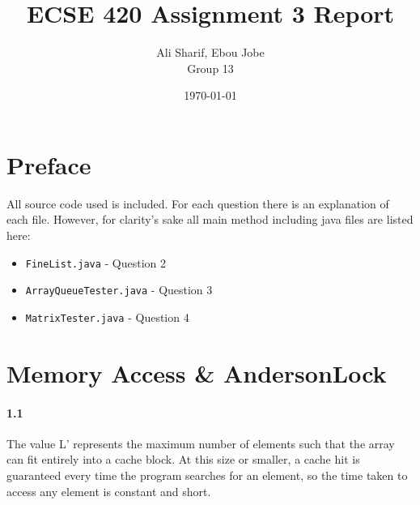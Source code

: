 \documentclass[12pt,letterpaper,titlepage]{article}
\author{Ali Sharif, Ebou Jobe \\ Group 13}
\title{ECSE 420 Assignment 3 Report}
\date{\today}
\begin{document}
  \maketitle
  \newpage
  \tableofcontents
  \newpage
  
  \setlength{\parskip}{1em}
  
  \section{Preface}
    All source code used is included. For each question there is an explanation of each file. However, for clarity's sake all main method including java files are listed here:
    \begin{itemize}
      \itemsep 0em
      \item \texttt{FineList.java} - Question 2
      \item \texttt{ArrayQueueTester.java} - Question 3
      \item \texttt{MatrixTester.java} - Question 4
    \end{itemize}
  
  \section{Memory Access \& AndersonLock}
    
    \paragraph{1.1}
    The value L’ represents the maximum number of elements such that the array can fit entirely into a cache block. At this size or smaller, a cache hit is guaranteed every time the program searches for an element, so the time taken to access any element is constant and short.
    
\end{document}
